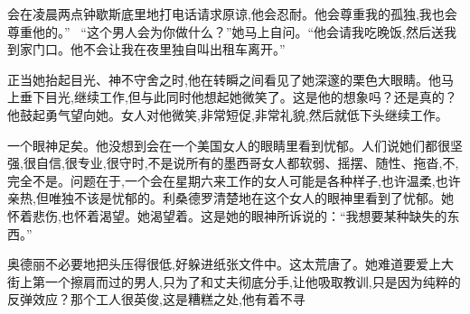\documentclass{ctexart}
\renewcommand{\\}{\par}
\begin{document}
会在凌晨两点钟歇斯底里地打电话请求原谅,他会忍耐。他会尊重我的孤独,我也会尊重他的。” \ “这个男人会为你做什么？”她马上自问。“他会请我吃晚饭,然后送我到家门口。他不会让我在夜里独自叫出租车离开。” \\正当她抬起目光、神不守舍之时,他在转瞬之间看见了她深邃的栗色大眼睛。他马上垂下目光,继续工作,但与此同时他想起她微笑了。这是他的想象吗？还是真的？他鼓起勇气望向她。女人对他微笑,非常短促,非常礼貌,然后就低下头继续工作。\\一个眼神足矣。他没想到会在一个美国女人的眼睛里看到忧郁。人们说她们都很坚强,很自信,很专业,很守时,不是说所有的墨西哥女人都软弱、摇摆、随性、拖沓,不,完全不是。问题在于,一个会在星期六来工作的女人可能是各种样子,也许温柔,也许亲热,但唯独不该是忧郁的。利桑德罗清楚地在这个女人的眼神里看到了忧郁。她怀着悲伤,也怀着渴望。她渴望着。这是她的眼神所诉说的：“我想要某种缺失的东西。” \\奥德丽不必要地把头压得很低,好躲进纸张文件中。这太荒唐了。她难道要爱上大街上第一个擦肩而过的男人,只为了和丈夫彻底分手,让他吸取教训,只是因为纯粹的反弹效应？那个工人很英俊,这是糟糕之处,他有着不寻
\end{document}
